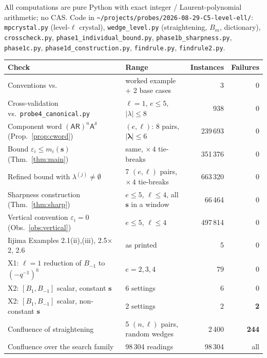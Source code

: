 \documentclass[11pt]{article}
\theoremstyle{definition}
\newcommand{\eps}{\varepsilon}
\newcommand{\Aa}{{\mathsf A}}
\newcommand{\Rr}{{\mathsf R}}
\newcommand{\bs}{\mathbf{s}}
\newcommand{\blam}{\boldsymbol{\lambda}}
\newcommand{\Bmi}{B_{-1}}
\begin{document}
All computations are pure Python with exact integer / Laurent-polynomial
arithmetic; no CAS. Code in
\verb|~/projects/probes/2026-08-29-C5-level-ell/|:
\verb|mpcrystal.py| (level-$\ell$ crystal), \verb|wedge_level.py|
(straightening, $B_m$, dictionary), \verb|crosscheck.py|,
\verb|phase1_individual_bound.py|, \verb|phase1b_sharpness.py|,
\verb|phase1c.py|, \verb|phase1d_construction.py|, \verb|findrule.py|,
\verb|findrule2.py|.

\begin{center}
\begin{tabular}{llrr}
\toprule
Check & Range & Instances & Failures \\
\midrule
Conventions vs.\ \cite{Clio-C5-2026-08-11}
  & worked example + 2 base cases & 3 & 0 \\
Cross-validation vs.\ \verb|probe4_canonical.py|
  & $\ell=1$, $e \le 5$, $|\lambda| \le 8$ & 938 & 0 \\
Component word $(\Aa\Rr)^n\Aa^{\delta}$ (Prop.~\ref{prop:cword})
  & $(e,\ell)$: 8 pairs, $|\blam| \le 6$ & 239\,693 & 0 \\
Bound $\eps_i \le m_i(\bs)$ (Thm.~\ref{thm:main})
  & same, $\times\,4$ tie-breaks & 351\,376 & 0 \\
Refined bound with $\lambda^{(j)}\ne\emptyset$
  & 7 $(e,\ell)$ pairs, $\times\,4$ tie-breaks & 663\,320 & 0 \\
Sharpness construction (Thm.~\ref{thm:sharp})
  & $e \le 5$, $\ell \le 4$, all $\bs$ in a window & 66\,464 & 0 \\
Vertical convention $\eps_i = 0$ (Obs.~\ref{obs:vertical})
  & $e \le 5$, $\ell \le 4$ & 497\,814 & 0 \\
\midrule
Iijima Examples 2.1(ii),(iii), 2.5$\times$2, 2.6
  & as printed & 5 & 0 \\
X1: $\ell=1$ reduction of $\Bmi$ to $(-q^{-1})^h$
  & $e = 2,3,4$ & 79 & 0 \\
X2: $[B_1,B_{-1}]$ scalar, constant $\bs$
  & 6 settings & 6 & 0 \\
X2: $[B_1,B_{-1}]$ scalar, non-constant $\bs$
  & 2 settings & 2 & \textbf{2} \\
Confluence of straightening
  & 5 $(n,\ell)$ pairs, random wedges & 2\,400 & \textbf{244} \\
Confluence over the search family
  & 98\,304 readings & 98\,304 & all \\
\bottomrule
\end{tabular}
\end{center}
\end{document}
